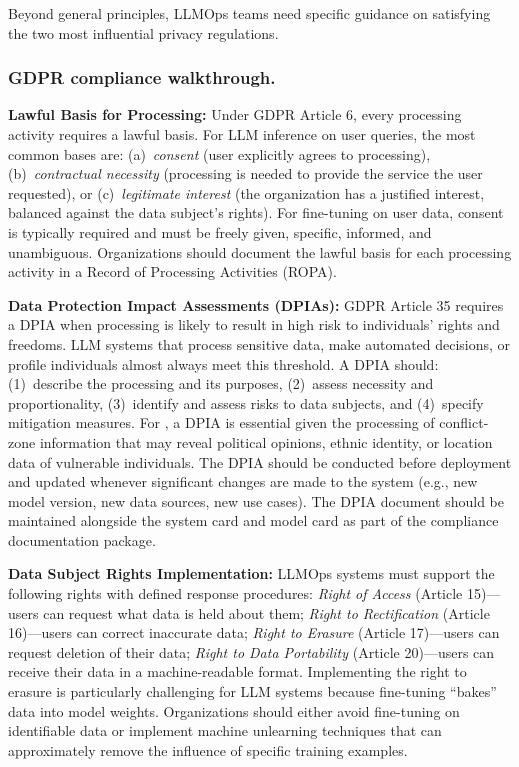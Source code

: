Beyond general principles, LLMOps teams need specific guidance on satisfying the two most influential privacy regulations.

\subsubsection{GDPR compliance walkthrough.}

\textbf{Lawful Basis for Processing:} Under GDPR Article 6, every processing activity requires a lawful basis. For LLM inference on user queries, the most common bases are: (a)~\emph{consent} (user explicitly agrees to processing), (b)~\emph{contractual necessity} (processing is needed to provide the service the user requested), or (c)~\emph{legitimate interest} (the organization has a justified interest, balanced against the data subject's rights). For fine-tuning on user data, consent is typically required and must be freely given, specific, informed, and unambiguous. Organizations should document the lawful basis for each processing activity in a Record of Processing Activities (ROPA).

\textbf{Data Protection Impact Assessments (DPIAs):} GDPR Article 35 requires a DPIA when processing is likely to result in high risk to individuals' rights and freedoms. LLM systems that process sensitive data, make automated decisions, or profile individuals almost always meet this threshold. A DPIA should: (1)~describe the processing and its purposes, (2)~assess necessity and proportionality, (3)~identify and assess risks to data subjects, and (4)~specify mitigation measures. For \ishtar{}, a DPIA is essential given the processing of conflict-zone information that may reveal political opinions, ethnic identity, or location data of vulnerable individuals. The DPIA should be conducted before deployment and updated whenever significant changes are made to the system (e.g., new model version, new data sources, new use cases). The DPIA document should be maintained alongside the system card and model card as part of the compliance documentation package.

\textbf{Data Subject Rights Implementation:} LLMOps systems must support the following rights with defined response procedures: \emph{Right of Access} (Article 15)---users can request what data is held about them; \emph{Right to Rectification} (Article 16)---users can correct inaccurate data; \emph{Right to Erasure} (Article 17)---users can request deletion of their data; \emph{Right to Data Portability} (Article 20)---users can receive their data in a machine-readable format. Implementing the right to erasure is particularly challenging for LLM systems because fine-tuning ``bakes'' data into model weights. Organizations should either avoid fine-tuning on identifiable data or implement machine unlearning techniques that can approximately remove the influence of specific training examples.

